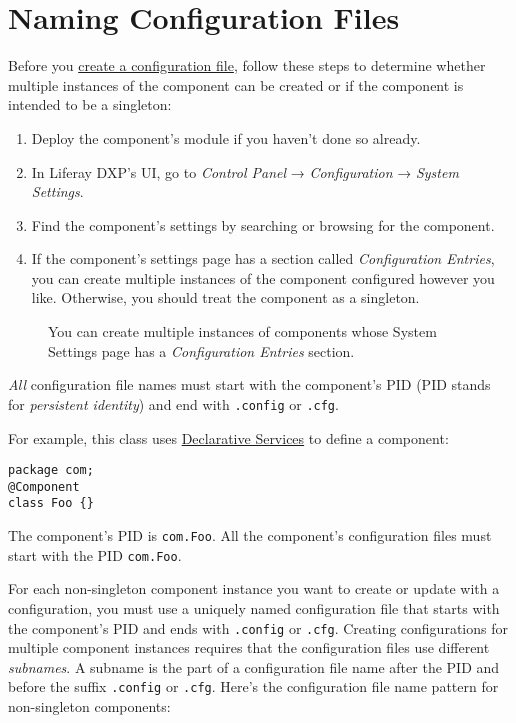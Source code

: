 \section{Naming Configuration Files}\label{naming-configuration-files}

Before you
\href{/docs/7-1/user/-/knowledge_base/u/creating-configuration-files}{create
a configuration file}, follow these steps to determine whether multiple
instances of the component can be created or if the component is
intended to be a singleton:

\begin{enumerate}
\def\labelenumi{\arabic{enumi}.}
\item
  Deploy the component's module if you haven't done so already.
\item
  In Liferay DXP's UI, go to \emph{Control Panel} → \emph{Configuration}
  → \emph{System Settings}.
\item
  Find the component's settings by searching or browsing for the
  component.
\item
  If the component's settings page has a section called
  \emph{Configuration Entries}, you can create multiple instances of the
  component configured however you like. Otherwise, you should treat the
  component as a singleton.
\end{enumerate}

\begin{figure}
\centering
{}
\caption{You can create multiple instances of components whose System
Settings page has a \emph{Configuration Entries} section.}
\end{figure}

\emph{All} configuration file names must start with the component's PID
(PID stands for \emph{persistent identity}) and end with
\texttt{.config} or \texttt{.cfg}.

For example, this class uses
\href{/docs/7-2/frameworks/-/knowledge_base/f/declarative-services}{Declarative
Services} to define a component:

\begin{verbatim}
package com;
@Component
class Foo {}
\end{verbatim}

The component's PID is \texttt{com.Foo}. All the component's
configuration files must start with the PID \texttt{com.Foo}.

For each non-singleton component instance you want to create or update
with a configuration, you must use a uniquely named configuration file
that starts with the component's PID and ends with \texttt{.config} or
\texttt{.cfg}. Creating configurations for multiple component instances
requires that the configuration files use different \emph{subnames}. A
subname is the part of a configuration file name after the PID and
before the suffix \texttt{.config} or \texttt{.cfg}. Here's the
configuration file name pattern for non-singleton components:

